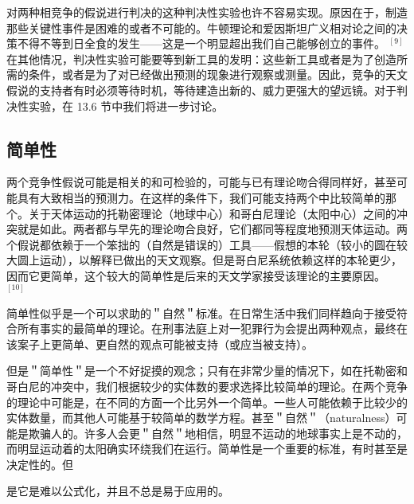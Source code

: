 对两种相竞争的假说进行判决的这种判决性实验也许不容易实现。原因在于，制造那些关键性事件是困难的或者不可能的。牛顿理论和爱因斯坦广义相对论之间的决策不得不等到日全食的发生——这是一个明显超出我们自己能够创立的事件。 ${ }^{[9]}$ 在其他情况，判决性实验可能要等到新工具的发明：这些新工具或者是为了创造所需的条件，或者是为了对已经做出预测的现象进行观察或测量。因此，竞争的天文假说的支持者有时必须等待时机，等待建造出新的、威力更强大的望远镜。对于判决性实验，在 13.6 节中我们将进一步讨论。

\subsection{简单性}
两个竞争性假说可能是相关的和可检验的，可能与已有理论吻合得同样好，甚至可能具有大致相当的预测力。在这样的条件下，我们可能支持两个中比较简单的那个。关于天体运动的托勒密理论（地球中心）和哥白尼理论（太阳中心）之间的冲突就是如此。两者都与早先的理论吻合良好，它们都同等程度地预测天体运动。两个假说都依赖于一个笨拙的（自然是错误的）工具——假想的本轮（较小的圆在较大圆上运动），以解释已做出的天文观察。但是哥白尼系统依赖这样的本轮更少，因而它更简单，这个较大的简单性是后来的天文学家接受该理论的主要原因。 ${ }^{[10]}$

简单性似乎是一个可以求助的＂自然＂标准。在日常生活中我们同样趋向于接受符合所有事实的最简单的理论。在刑事法庭上对一犯罪行为会提出两种观点，最终在该案子上更简单、更自然的观点可能被支持（或应当被支持）。

但是＂简单性＂是一个不好捉摸的观念；只有在非常少量的情况下，如在托勒密和哥白尼的冲突中，我们根据较少的实体数的要求选择比较简单的理论。在两个竞争的理论中可能是，在不同的方面一个比另外一个简单。一些人可能依赖于比较少的实体数量，而其他人可能基于较简单的数学方程。甚至＂自然＂（naturalness）可能是欺骗人的。许多人会更＂自然＂地相信，明显不运动的地球事实上是不动的，而明显运动着的太阳确实环绕我们在运行。简单性是一个重要的标准，有时甚至是决定性的。但

是它是难以公式化，并且不总是易于应用的。 

